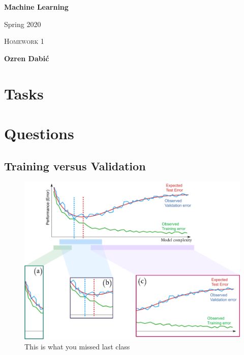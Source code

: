 \documentclass[12pt,a4paper]{article}
\begin{document}
\begin{center}
  
  \bigskip \bigskip

  {\huge \textbf{Machine Learning}}

  \bigskip
  
  {\large Spring 2020}

  \bigskip \bigskip

  {\large \textsc{Homework 1}} 
  
  \bigskip \bigskip
  
  {\large \textbf{Ozren Dabić}}
  
  \bigskip \bigskip

\end{center}

\section*{Tasks}

\newpage
\section*{Questions}

\subsection*{Training versus Validation}

\begin{figure}[h!]
\begin{center}    
\includegraphics[width=1\textwidth,keepaspectratio]{figures/figure1}
\end{center}
\caption{This is what you missed last class}
\end{figure}
\end{document}
